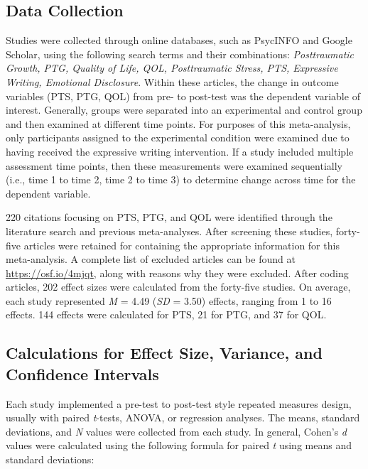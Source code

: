 \documentclass[english,man]{apa6}
\theoremstyle{definition}
\theoremstyle{definition}
\theoremstyle{definition}
\theoremstyle{remark}
\begin{document}
\subsection{Data Collection}\label{data-collection}

Studies were collected through online databases, such as PsycINFO and
Google Scholar, using the following search terms and their combinations:
\emph{Posttraumatic Growth, PTG, Quality of Life, QOL, Posttraumatic
Stress, PTS, Expressive Writing, Emotional Disclosure}. Within these
articles, the change in outcome variables (PTS, PTG, QOL) from pre- to
post-test was the dependent variable of interest. Generally, groups were
separated into an experimental and control group and then examined at
different time points. For purposes of this meta-analysis, only
participants assigned to the experimental condition were examined due to
having received the expressive writing intervention. If a study included
multiple assessment time points, then these measurements were examined
sequentially (i.e., time 1 to time 2, time 2 to time 3) to determine
change across time for the dependent variable.

220 citations focusing on PTS, PTG, and QOL were identified through the
literature search and previous meta-analyses. After screening these
studies, forty-five articles were retained for containing the
appropriate information for this meta-analysis. A complete list of
excluded articles can be found at \url{https://osf.io/4mjqt}, along with
reasons why they were excluded. After coding articles, 202 effect sizes
were calculated from the forty-five studies. On average, each study
represented \emph{M} = 4.49 (\emph{SD} = 3.50) effects, ranging from 1
to 16 effects. 144 effects were calculated for PTS, 21 for PTG, and 37
for QOL.

\subsection{Calculations for Effect Size, Variance, and Confidence
Intervals}\label{calculations-for-effect-size-variance-and-confidence-intervals}

Each study implemented a pre-test to post-test style repeated measures
design, usually with paired \emph{t}-tests, ANOVA, or regression
analyses. The means, standard deviations, and \emph{N} values were
collected from each study. In general, Cohen's \emph{d} values were
calculated using the following formula for paired \emph{t} using means
and standard deviations:
\end{document}
